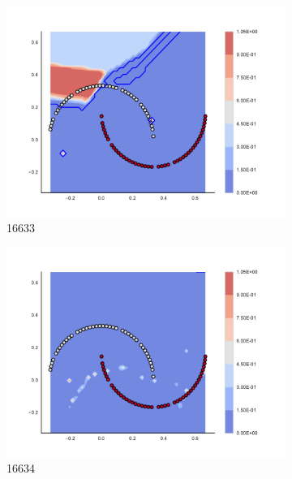 \begin{figure}[h]
\begin{subfigure}[b]{0.09\textwidth}
    \includegraphics[clip, trim=2.35cm 1.75cm 4.5cm 0cm,width=\textwidth]{img/convergence/16633.pdf}
    \caption{16633}
    \label{fig:convergence_16633}
\end{subfigure}
%
\begin{subfigure}[b]{0.09\textwidth}
    \includegraphics[clip, trim=2.35cm 1.75cm 4.5cm 0cm,width=\textwidth]{img/convergence/16634.pdf}
    \caption{16634}
    \label{fig:convergence_16634}
\end{subfigure}
%
\begin{subfigure}[b]{0.09\textwidth}

\end{subfigure}
\end{figure}
